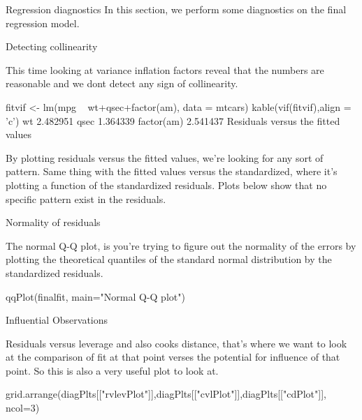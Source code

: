 Regression diagnostics
In this section, we perform some diagnostics on the final regression model.

Detecting collinearity

This time looking at variance inflation factors reveal that the numbers are reasonable and we dont detect any sign of collinearity.

fitvif <- lm(mpg ~ wt+qsec+factor(am), data = mtcars)
kable(vif(fitvif),align = 'c')
wt	2.482951
qsec	1.364339
factor(am)	2.541437
Residuals versus the fitted values

By plotting residuals versus the fitted values, we’re looking for any sort of pattern. Same thing with the fitted values versus the standardized, where it’s plotting a function of the standardized residuals. Plots below show that no specific pattern exist in the residuals.


Normality of residuals

The normal Q-Q plot, is you’re trying to figure out the normality of the errors by plotting the theoretical quantiles of the standard normal distribution by the standardized residuals.

qqPlot(finalfit, main="Normal Q-Q plot")

Influential Observations

Residuals versus leverage and also cooks distance, that’s where we want to look at the comparison of fit at that point verses the potential for influence of that point. So this is also a very useful plot to look at.

grid.arrange(diagPlts[["rvlevPlot"]],diagPlts[["cvlPlot"]],diagPlts[["cdPlot"]], ncol=3)
